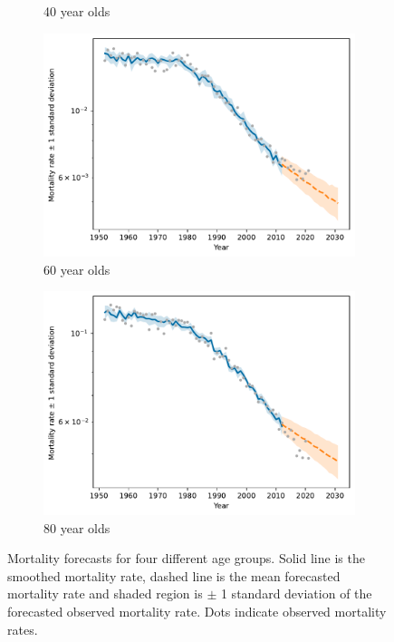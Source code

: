 \documentclass[preprint,12pt]{elsarticle}
\begin{document}
\begin{figure}
\begin{subfigure}[b]{0.45\textwidth}
        \caption{40 year olds}
    \end{subfigure}
    \hfill
    \begin{subfigure}[b]{0.45\textwidth}
        \centering
        \includegraphics[width=\textwidth]{figs/sweden_1952_2011_Male_100_1_3rateVsTimeAge60.pdf}
        \caption{60 year olds}
    \end{subfigure}
    \hfill
    \begin{subfigure}[b]{0.45\textwidth}
        \centering
        \includegraphics[width=\textwidth]{figs/sweden_1952_2011_Male_100_1_3rateVsTimeAge80.pdf}
        \caption{80 year olds}
    \end{subfigure}
       \caption{Mortality forecasts for four different age groups. Solid line is the smoothed mortality rate, dashed line is the mean forecasted mortality rate and shaded region is $\pm$ 1 standard deviation of the forecasted observed mortality rate. Dots indicate observed mortality rates.}
       \label{fig:model_forecast_sweden}
\end{figure}
\end{document}
